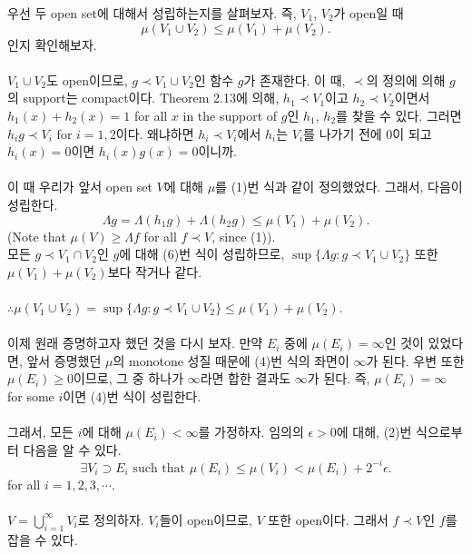 \documentclass[11pt,reqno]{amsart}
\renewcommand{\(}{\left(}
\renewcommand{\)}{\right)}
\renewcommand{\[}{\left[}
\renewcommand{\]}{\right]}
\newcommand{\ep}{\epsilon}
\begin{document}
우선 두 open set에 대해서 성립하는지를 살펴보자. 즉, $V_1$, $V_2$가 open일 때
\begin{equation}
  \mu(V_1 \cup V_2) \le \mu(V_1) + \mu(V_2).
\end{equation}
인지 확인해보자. \\ \\
$V_1 \cup V_2$도 open이므로, $g \prec V_1 \cup V_2$인 함수 $g$가 존재한다. 이 때, $\prec$의 정의에 의해
$g$의 support는 compact이다. Theorem 2.13에 의해, $h_1 \prec V_1$이고 $h_2 \prec V_2$이면서 
$h_1(x) + h_2(x) = 1$ for all $x$ in the support of $g$인 $h_1$, $h_2$를 찾을 수 있다. 그러면
$h_i g \prec V_i$ for $i=1, 2$이다. 왜냐하면 $h_i \prec V_i$에서 $h_i$는 $V_i$를 나가기 전에 0이 되고
$h_i(x)=0$이면  $h_i(x) g(x) = 0$이니까. \\ \\
이 때 우리가 앞서 open set $V$에 대해 $\mu$를 (1)번 식과 같이 정의했었다. 그래서, 다음이 성립한다.
\begin{equation}
  \Lambda g = \Lambda (h_1 g) + \Lambda (h_2 g) \le \mu (V_1) + \mu (V_2).
\end{equation}
(Note that $\mu(V) \ge \Lambda f$ for all $f \prec V$, since (1)). \\
모든 $g \prec V_1 \cap V_2$인 $g$에 대해 (6)번 식이 성립하므로, $\sup \{ \Lambda g : g \prec V_1 \cup V_2 \}$ 
또한 $\mu (V_1) + \mu (V_2)$보다 작거나 같다. \\ \\
$\therefore \mu(V_1 \cup V_2) = \sup \{ \Lambda g : g \prec V_1 \cup V_2 \} \le \mu (V_1) + \mu (V_2)$. \\ \\
이제 원래 증명하고자 했던 것을 다시 보자. 만약 $E_i$ 중에 $\mu (E_i) = \infty$인 것이 있었다면, 앞서 증명했던 
$\mu$의 monotone 성질 때문에 (4)번 식의 좌면이 $\infty$가 된다. 우변 또한 $\mu(E_i) \ge 0$이므로, 그 중 하나가 
$\infty$라면 합한 결과도 $\infty$가 된다. 즉, $\mu (E_i) = \infty$ for some $i$이면 (4)번 식이 성립한다. \\ \\
그래서, 모든 $i$에 대해 $\mu (E_i) < \infty$를 가정하자. 임의의 $\ep > 0$에 대해, (2)번 식으로부터 다음을 알 수 있다.
\begin{equation*}
  \exists V_i \supset E_i \text{ such that } \mu(E_i) \le \mu(V_i) < \mu(E_i) + 2^{-i} \ep.
\end{equation*}
for all $i = 1, 2, 3, \cdots$. \\ \\
$\displaystyle V = \bigcup _{i=1} ^\infty V_i$로 정의하자. $V_i$들이 open이므로, $V$ 또한 open이다. 그래서 $f \prec V$인 $f$를 잡을 수 있다.
\end{document}
